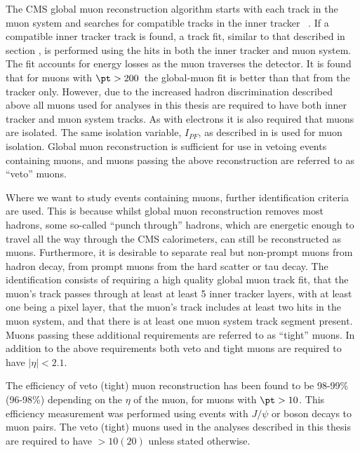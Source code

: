 The CMS global muon reconstruction algorithm starts with each track in the muon system and searches for compatible tracks in the inner tracker ~\cite{MuonReco}. If a compatible inner tracker track is found, a track fit, similar to that described in section , is performed using the hits in both the inner tracker and muon system. The fit accounts for energy losses as the muon traverses the detector. It is found that for muons with $\pt>200$\GeV\, the global-muon fit is better than that from the tracker only. However, due to the increased hadron discrimination described above all muons used for analyses in this thesis are required to have both inner tracker and muon system tracks. As with electrons it is also required that muons are isolated. The same isolation variable, $I_{PF}$, as described in  is used for muon isolation. Global muon reconstruction is sufficient for use in vetoing events containing muons, and muons passing the above reconstruction are referred to as ``veto'' muons.

Where we want to study events containing muons, further identification criteria are used. This is because whilst global muon reconstruction removes most hadrons, some so-called ``punch through'' hadrons, which are energetic enough to travel all the way through the CMS calorimeters, can still be reconstructed as muons. Furthermore, it is desirable to separate real but non-prompt muons from hadron decay, from prompt muons from the hard scatter or tau decay. The identification consists of requiring a high quality global muon track fit, that the muon's track passes through at least at least 5 inner tracker layers, with at least one being a pixel layer, that the muon's track includes at least two hits in the muon system, and that there is at least one muon system track segment present. Muons passing these additional requirements are referred to as ``tight'' muons. In addition to the above requirements both veto and tight muons are required to have $|\eta|<2.1$.

The efficiency of veto (tight) muon reconstruction has been found to be 98-99\% (96-98\%) depending on the $\eta$ of the muon, for muons with $\pt>10$\GeV. This efficiency measurement was performed using events with $J/\psi$ or \PZ boson decays to muon pairs. The veto (tight) muons used in the analyses described in this thesis are required to have \pt$>10 (20)$ \GeV unless stated otherwise.

